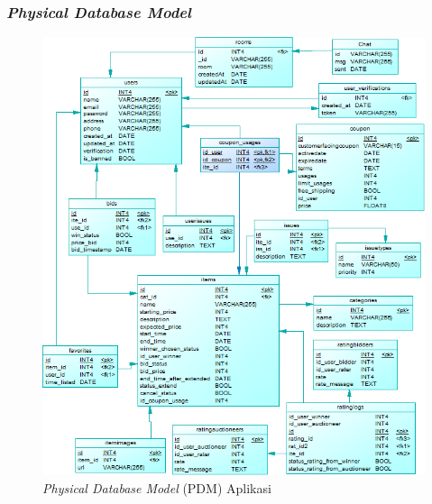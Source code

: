 	\subsubsection{\textit{Physical Database Model}}
	\begin{figure}[H]
		\centering
		\includegraphics[width=\textwidth]{images/bab3/db/pdm.png}
		\caption{\textit{Physical Database Model} (PDM) Aplikasi}
		\label{pdm}
	\end{figure}
	
%   	
    
